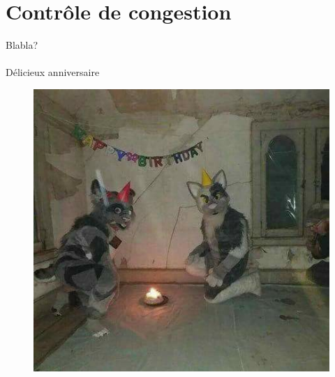 \documentclass[11pt]{article}
\begin{document}
\section{Contrôle de congestion}
Blabla?
\\ \\ Délicieux anniversaire
\begin{figure}[h]
  \includegraphics[scale=0.7]{HP.png}
\end{figure}
\end{document}
